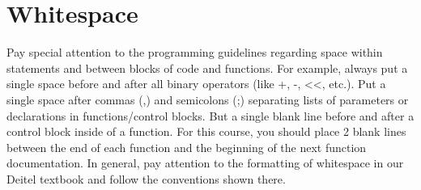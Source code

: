\documentclass[11pt]{article}
\begin{document}
\section*{Whitespace}
\label{sec-7}

Pay special attention to the programming guidelines regarding space
within statements and between blocks of code and functions.  For
example, always put a single space before and after all binary
operators (like +, -, <<, etc.).  Put a single space after commas (,)
and semicolons (;) separating lists of parameters or declarations in
functions/control blocks.  But a single blank line before and after a
control block inside of a function.  For this course, you should place
2 blank lines between the end of each function and the beginning of
the next function documentation.  In general, pay attention to the
formatting of whitespace in our Deitel textbook and follow the
conventions shown there.
\end{document}
